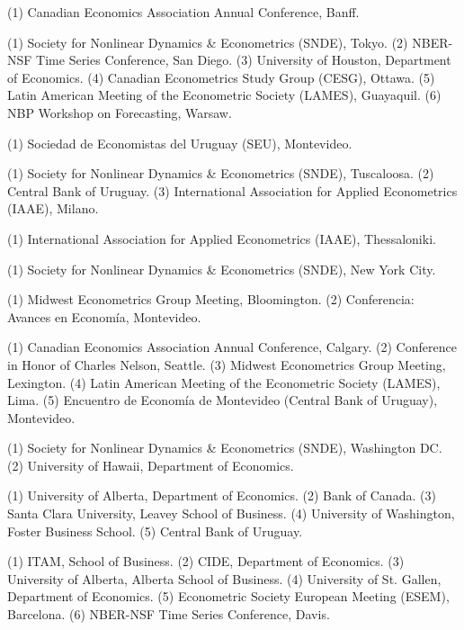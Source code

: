 \documentclass[overlapped,letterpaper,11pt]{res}
\begin{document}
\begin{resume}
\begin{mylist}
	\item [2019]
	(1) Canadian Economics Association Annual Conference, Banff.

	\item [2018]
	(1) Society for Nonlinear Dynamics \& Econometrics (SNDE), Tokyo.
	(2) NBER-NSF Time Series Conference, San Diego.
	(3) University of Houston, Department of Economics.
	(4) Canadian Econometrics Study Group (CESG), Ottawa.
	(5) Latin American Meeting of the Econometric Society (LAMES), Guayaquil.
	(6) NBP Workshop on Forecasting, Warsaw.

	\item [2017]
	(1) Sociedad de Economistas del Uruguay (SEU), Montevideo.

	\item [2016]
	(1) Society for Nonlinear Dynamics \& Econometrics (SNDE), Tuscaloosa.
	(2) Central Bank of Uruguay.
	(3) International Association for Applied Econometrics (IAAE), Milano.

	\item [2015]
	(1) International Association for Applied Econometrics (IAAE), Thessaloniki.

	\item [2014]
	(1) Society for Nonlinear Dynamics \& Econometrics (SNDE), New York City.

	\item [2013]
	(1) Midwest Econometrics Group Meeting, Bloomington.
	(2) Conferencia: Avances en Econom\'ia, Montevideo.

	\item [2012]
	(1) Canadian Economics Association Annual Conference, Calgary.
	(2) Conference in Honor of Charles Nelson, Seattle.
	(3) Midwest Econometrics Group Meeting, Lexington.
	(4) Latin American Meeting of the Econometric Society (LAMES), Lima.
	(5) Encuentro de Econom\'ia de Montevideo (Central Bank of Uruguay), Montevideo.

	\item [2011]
	(1) Society for Nonlinear Dynamics \& Econometrics (SNDE), Washington DC.
	(2) University of Hawaii, Department of Economics.

	\item [2010]
	(1) University of Alberta, Department of Economics. (2) Bank of Canada.
	(3) Santa Clara University,  Leavey School of Business. (4) University of Washington,
	Foster Business School. (5) Central Bank of Uruguay.

	\item [2009]
	(1) ITAM, School of Business. (2) CIDE, Department of Economics.
	(3) University of Alberta, Alberta School of Business. (4) University of St. Gallen,
	Department of Economics. (5) Econometric Society European Meeting (ESEM), Barcelona.
	(6) NBER-NSF Time Series Conference, Davis.


\end{mylist}
\end{resume}
\end{document}
